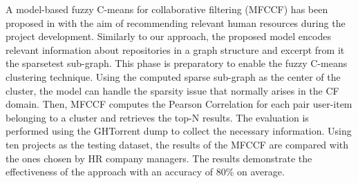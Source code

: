 A model-based fuzzy C-means for collaborative filtering (MFCCF) has been proposed in \cite{ajoudanian_recommending_2019} with the aim of recommending relevant human resources during the \GH project development. Similarly to our approach, the proposed model encodes relevant information about repositories in a graph structure and excerpt from it the sparsetest sub-graph. This phase is preparatory to enable the fuzzy C-means clustering technique. Using the computed sparse sub-graph as the center of the cluster, the model can handle the sparsity issue that normally arises in the CF domain. Then, MFCCF computes the Pearson Correlation for each pair user-item belonging to a cluster and retrieves the top-N results. The evaluation is performed using the GHTorrent dump to collect the necessary information. Using ten projects as the testing dataset, the results of the MFCCF are compared with the ones chosen by HR company managers. The results demonstrate the effectiveness of the approach with an accuracy of 80\% on average. 